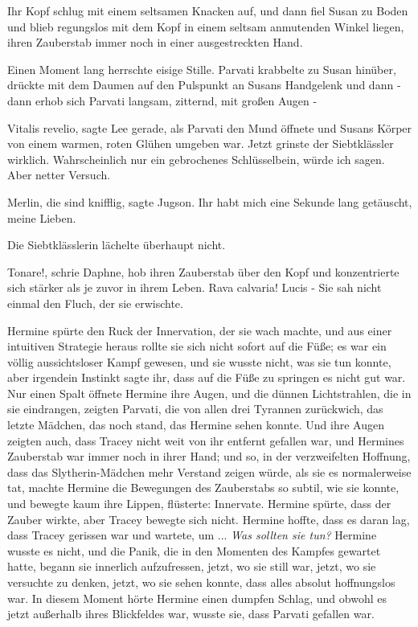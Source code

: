 Ihr Kopf schlug mit einem seltsamen Knacken auf, und dann fiel Susan zu Boden
und blieb regungslos mit dem Kopf in einem seltsam anmutenden Winkel liegen,
ihren Zauberstab immer noch in einer ausgestreckten Hand.

Einen Moment lang herrschte eisige Stille. Parvati krabbelte zu Susan hinüber,
drückte mit dem Daumen auf den Pulspunkt an Susans Handgelenk und dann - dann
erhob sich Parvati langsam, zitternd, mit großen Augen -

\glqq{}Vitalis revelio\grqq{}, sagte Lee gerade, als Parvati den Mund öffnete und
Susans Körper von einem warmen, roten Glühen umgeben war. Jetzt grinste der
Siebtklässler wirklich. \glqq{}Wahrscheinlich nur ein gebrochenes Schlüsselbein,
würde ich sagen. Aber netter Versuch.\grqq{}

\glqq{}Merlin, die sind knifflig\grqq{}, sagte Jugson. \glqq{}Ihr habt mich eine
Sekunde lang getäuscht, meine Lieben.\grqq{}

Die Siebtklässlerin lächelte überhaupt nicht.

\glqq{}Tonare!\grqq{}, schrie Daphne, hob ihren Zauberstab über den Kopf und
konzentrierte sich stärker als je zuvor in ihrem Leben. \glqq{}Rava calvaria!
Lucis -\grqq{} Sie sah nicht einmal den Fluch, der sie erwischte.

Hermine spürte den Ruck der Innervation, der sie wach machte, und aus einer
intuitiven Strategie heraus rollte sie sich nicht sofort auf die Füße; es war
ein völlig aussichtsloser Kampf gewesen, und sie wusste nicht, was sie tun
konnte, aber irgendein Instinkt sagte ihr, dass auf die Füße zu springen es
nicht gut war. Nur einen Spalt öffnete Hermine ihre Augen, und die dünnen
Lichtstrahlen, die in sie eindrangen, zeigten Parvati, die von allen drei
Tyrannen zurückwich, das letzte Mädchen, das noch stand, das Hermine sehen
konnte. Und ihre Augen zeigten auch, dass Tracey nicht weit von ihr entfernt
gefallen war, und Hermines Zauberstab war immer noch in ihrer Hand; und so, in
der verzweifelten Hoffnung, dass das Slytherin-Mädchen mehr Verstand zeigen
würde, als sie es normalerweise tat, machte Hermine die Bewegungen des
Zauberstabs so subtil, wie sie konnte, und bewegte kaum ihre Lippen, flüsterte:
\glqq{}Innervate.\grqq{} Hermine spürte, dass der Zauber wirkte, aber Tracey
bewegte sich nicht. Hermine hoffte, dass es daran lag, dass Tracey gerissen war
und wartete, um ... \emph{Was sollten sie tun?} Hermine wusste es nicht, und die
Panik, die in den Momenten des Kampfes gewartet hatte, begann sie innerlich
aufzufressen, jetzt, wo sie still war, jetzt, wo sie versuchte zu denken, jetzt,
wo sie sehen konnte, dass alles absolut hoffnungslos war. In diesem Moment hörte
Hermine einen dumpfen Schlag, und obwohl es jetzt außerhalb ihres Blickfeldes
war, wusste sie, dass Parvati gefallen war.

